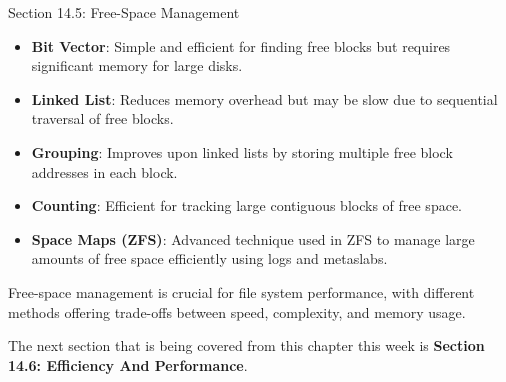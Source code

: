 \begin{notes}{Section 14.5: Free-Space Management}
\begin{highlight}
        \begin{itemize}
            \item \textbf{Bit Vector}: Simple and efficient for finding free blocks but requires significant memory for large disks.
            \item \textbf{Linked List}: Reduces memory overhead but may be slow due to sequential traversal of free blocks.
            \item \textbf{Grouping}: Improves upon linked lists by storing multiple free block addresses in each block.
            \item \textbf{Counting}: Efficient for tracking large contiguous blocks of free space.
            \item \textbf{Space Maps (ZFS)}: Advanced technique used in ZFS to manage large amounts of free space efficiently using logs and metaslabs.
        \end{itemize}
    
    Free-space management is crucial for file system performance, with different methods offering trade-offs between speed, complexity, and memory usage.
    
    \end{highlight}
\end{notes}

The next section that is being covered from this chapter this week is \textbf{Section 14.6: Efficiency And Performance}.

